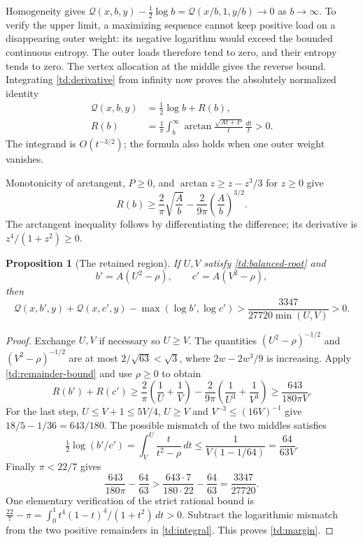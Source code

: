 \documentclass[11pt]{article}
\numberwithin{equation}{section}
\newtheorem{proposition}[theorem]{Proposition}
\theoremstyle{definition}
\newcommand{\calQ}{\mathcal Q}
\begin{document}
Homogeneity gives
\(\calQ(x,b,y)-\frac12\log b=\calQ(x/b,1,y/b)\to0\)
as \(b\to\infty\). To verify the upper limit, a maximizing
sequence cannot keep positive load on a disappearing outer weight:
its negative logarithm would exceed the bounded continuous
entropy. The outer loads therefore tend to zero, and their
entropy tends to zero. The vertex allocation at the middle gives
the reverse bound. Integrating \eqref{td:derivative} from infinity
now proves the absolutely normalized identity
\begin{equation}\label{td:integral}
 \begin{aligned}
 \calQ(x,b,y)&=\tfrac12\log b+R(b),\\
 R(b)&=\frac1\pi\int_b^\infty
          \arctan\frac{\sqrt{At+P}}{t}\,\frac{dt}{t}>0 .
 \end{aligned}
\end{equation}
The integrand is \(O(t^{-3/2})\); the formula also holds when
one outer weight vanishes.

Monotonicity of arctangent, \(P\ge0\), and
\(\arctan z\ge z-z^3/3\) for \(z\ge0\) give
\begin{equation}\label{td:remainder-bound}
 R(b)\ge \frac2\pi\sqrt{\frac Ab}
                 -\frac2{9\pi}\left(\frac Ab\right)^{3/2}.
\end{equation}
The arctangent inequality follows by differentiating the difference;
its derivative is \(z^4/(1+z^2)\ge0\).

\begin{proposition}[The retained region]\label{td:retained}
If \(U,V\) satisfy \eqref{td:balanced-root} and
\[
 b'=A(U^2-\rho),\qquad c'=A(V^2-\rho),
\]
then
\begin{equation}\label{td:margin}
 \calQ(x,b',y)+\calQ(x,c',y)-\max(\log b',\log c')
          >\frac{3347}{27720\min(U,V)}>0.
\end{equation}
\end{proposition}

\begin{proof}
Exchange \(U,V\) if necessary so \(U\ge V\). The quantities
\((U^2-\rho)^{-1/2}\) and \((V^2-\rho)^{-1/2}\) are at most
\(2/\sqrt{63}<\sqrt3\), where \(2w-2w^3/9\) is increasing.
Apply \eqref{td:remainder-bound} and use \(\rho\ge0\) to obtain
\[
 R(b')+R(c')\ge
 \frac2\pi\left(\frac1U+\frac1V\right)
       -\frac2{9\pi}\left(\frac1{U^3}+\frac1{V^3}\right)
 \ge\frac{643}{180\pi V}.
\]
For the last step, \(U\le V+1\le5V/4\), \(U\ge V\) and
\(V^{-3}\le(16V)^{-1}\) give
\(18/5-1/36=643/180\).
The possible mismatch of the two middles satisfies
\[
 \tfrac12\log(b'/c')=
 \int_V^U\frac{t}{t^2-\rho}\,dt
 \le\frac{1}{V(1-1/64)}=\frac{64}{63V}.
\]
Finally \(\pi<22/7\) gives
\[
 \frac{643}{180\pi}-\frac{64}{63}>
 \frac{643\cdot7}{180\cdot22}-\frac{64}{63}
      =\frac{3347}{27720}.
\]
One elementary verification of the strict rational bound is
\(\frac{22}{7}-\pi=\int_0^1 t^4(1-t)^4/(1+t^2)\,dt>0\).
Subtract the logarithmic mismatch from the two positive remainders
in \eqref{td:integral}. This proves \eqref{td:margin}.
\end{proof}
\end{document}
